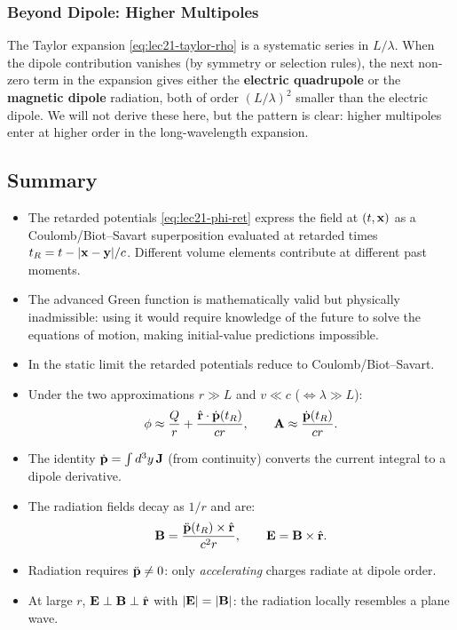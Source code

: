 \subsubsection*{Beyond Dipole: Higher Multipoles}
The Taylor expansion \eqref{eq:lec21-taylor-rho} is a systematic series in $L/\lambda$.
When the dipole contribution vanishes (by symmetry or selection rules), the next
non-zero term in the expansion gives either the \textbf{electric quadrupole} or the
\textbf{magnetic dipole} radiation, both of order $(L/\lambda)^2$ smaller than the
electric dipole. We will not derive these here, but the pattern is clear: higher
multipoles enter at higher order in the long-wavelength expansion.

\subsection*{Summary}

\begin{itemize}
  \item The retarded potentials \eqref{eq:lec21-phi-ret} express the field at $(t,\mathbf{x})$
        as a Coulomb/Biot--Savart superposition evaluated at retarded times
        $t_R = t - |\mathbf{x}-\mathbf{y}|/c$. Different volume elements contribute at different
        past moments.
  \item The advanced Green function is mathematically valid but physically inadmissible: using
        it would require knowledge of the future to solve the equations of motion, making
        initial-value predictions impossible.
  \item In the static limit the retarded potentials reduce to Coulomb/Biot--Savart.
  \item Under the two approximations $r\gg L$ and $v\ll c$ ($\Leftrightarrow \lambda\gg L$):
    \[
      \phi \approx \frac{Q}{r} + \frac{\hat{\mathbf{r}}\cdot\dot{\mathbf{p}}(t_R)}{cr},
      \qquad
      \mathbf{A} \approx \frac{\dot{\mathbf{p}}(t_R)}{cr}.
    \]
  \item The identity $\dot{\mathbf{p}} = \int d^3y\,\mathbf{J}$ (from continuity) converts the
        current integral to a dipole derivative.
  \item The radiation fields decay as $1/r$ and are:
    \[
      \mathbf{B} = \frac{\ddot{\mathbf{p}}(t_R)\times\hat{\mathbf{r}}}{c^2r},
      \qquad
      \mathbf{E} = \mathbf{B}\times\hat{\mathbf{r}}.
    \]
  \item Radiation requires $\ddot{\mathbf{p}}\neq 0$: only \emph{accelerating} charges
        radiate at dipole order.
  \item At large $r$, $\mathbf{E}\perp\mathbf{B}\perp\hat{\mathbf{r}}$ with $|\mathbf{E}|=|\mathbf{B}|$:
        the radiation locally resembles a plane wave.
\end{itemize}

